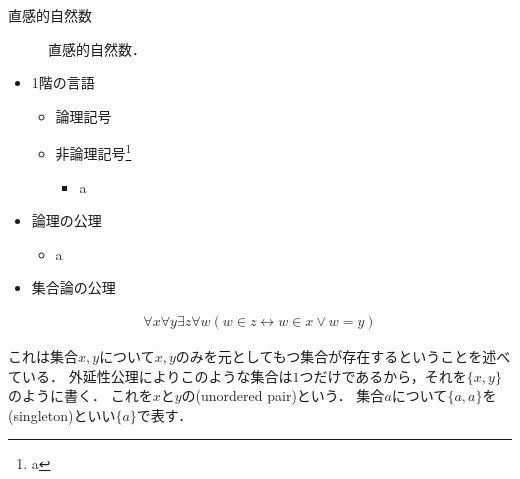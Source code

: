 \documentclass[../main.tex]{subfiles}
\begin{document}
\nocite{saito-kiso}

直感的自然数

\begin{figure}
    \centering
    \caption{直感的自然数．}
\end{figure}


\begin{itemize}
    \item 1階の言語
        \begin{itemize}
            \item 論理記号
            \item 非論理記号\footnote{a}
                \begin{itemize}
                    \item a
                \end{itemize}
        \end{itemize}
    \item 論理の公理
        \begin{itemize}
            \item a
        \end{itemize}
    \item 集合論の公理
\end{itemize}

\begin{thmbox}
\begin{axiom}
\begin{align}
    \forall x \forall y \exists z \forall w (w \in z \leftrightarrow w \in x \lor w = y)
\end{align}
\end{axiom}
\end{thmbox}

これは集合\(x, y\)について\(x, y\)のみを元としてもつ集合が存在するということを述べている．
外延性公理によりこのような集合は\(1\)つだけであるから，それを\(\{x, y\}\)のように書く．
これを\(x\)と\(y\)の(unordered pair)という．
集合\(a\)について\(\{a, a\}\)を(singleton)といい\(\{a\}\)で表す．
\end{document}
